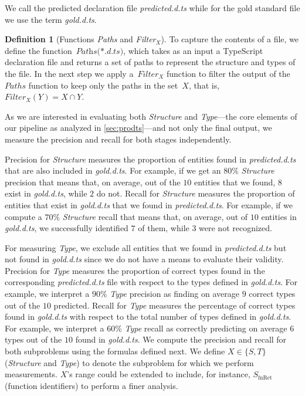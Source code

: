 \documentclass[sigplan,10pt,review,anonymous]{acmart} %
\theoremstyle{plain}
\theoremstyle{remark}
\theoremstyle{definition}
\newtheorem{defn}{Definition}[section]
\begin{document}
We call the predicted declaration file \emph{predicted.d.ts}
while for the gold standard file we use the term \emph{gold.d.ts}.

\begin{defn}[Functions \textit{Paths} and \textit{Filter$_X$}]
	To capture the contents of a file, we define the
	function~$\textit{Paths(*.d.ts)}$, which takes as an input a
	TypeScript declaration file and returns a set of paths
	to represent the structure and types of the file.
	In the next step we apply a~$Filter_X$ function to
	filter the output of the~$Paths$ function to keep only the paths in the set~$X$,
	that is,~$Filter_X(Y) =  X \cap Y$.
\end{defn}
As we are interested in evaluating both \textit{Structure}
and \textit{Type}---the core elements of our pipeline as analyzed in \cref{sec:prodts}---and
not only the final output, we measure the precision and recall for both stages independently.

Precision for \textit{Structure} measures the proportion of entities found in \textit{predicted.d.ts}
that are also included in \textit{gold.d.ts}.
%
For example, if we get an $80\%$ \textit{Structure} precision that means
that, on average, out of the $10$ entities that we found, $8$ exist in \textit{gold.d.ts}, while $2$ do not.
%
Recall for \textit{Structure} measures the proportion of entities that exist in \textit{gold.d.ts}
that we found in \textit{predicted.d.ts}.
%
For example, if we compute a $70\%$ \textit{Structure} recall
that means that, on average, out of $10$ entities in \textit{gold.d.ts},
we successfully identified $7$ of them, while $3$ were not recognized.

For measuring \textit{Type}, we exclude all entities that we found in \textit{predicted.d.ts}
but not found in \textit{gold.d.ts} since we do not have a means to evaluate their validity.
%
Precision for \textit{Type} measures the proportion of correct types
found in the corresponding \textit{predicted.d.ts} file
with respect to the types defined in \textit{gold.d.ts}.
%
For example, we interpret a $90\%$ \textit{Type} precision
as finding on average $9$ correct types out of the $10$ predicted.
%
Recall for \textit{Type} measures the percentage of correct types
found in \textit{gold.d.ts} with respect to the total number of types defined in \textit{gold.d.ts}.
%
For example, we interpret a $60\%$ \textit{Type} recall
as correctly predicting on average $6$ types out of the $10$ found in \textit{gold.d.ts}.
%
We compute the precision and recall for both subproblems using the formulas defined next.
%
We define $X \in \{S, T\}$ (\textit{Structure} and \textit{Type})
to denote the subproblem for which we perform measurements.
%
$X$'s range could be extended to include, for instance,
$S_\text{fnRet}$ (function identifiers) to perform a finer analysis.
\end{document}
